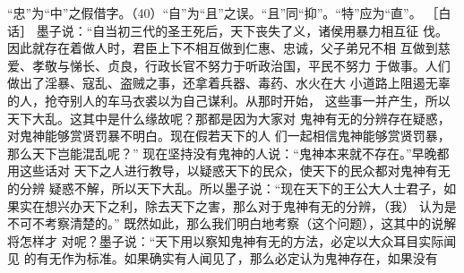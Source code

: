 \documentclass[12pt,UTF8]{ctexbook}
\begin{document}
“忠”为“中”之假借字。（40）“自”为“且”之误。“且”同“抑”。“特”应为“直”。 
［白话］ 
墨子说：“自当初三代的圣王死后，天下丧失了义，诸侯用暴力相互征 
伐。因此就存在着做人时，君臣上下不相互做到仁惠、忠诚，父子弟兄不相 
互做到慈爱、孝敬与悌长、贞良，行政长官不努力于听政治国，平民不努力 
于做事。人们做出了淫暴、寇乱、盗贼之事，还拿着兵器、毒药、水火在大 
小道路上阻遏无辜的人，抢夺别人的车马衣裘以为自己谋利。从那时开始， 
这些事一并产生，所以天下大乱。这其中是什么缘故呢？那都是因为大家对 
鬼神有无的分辨存在疑惑，对鬼神能够赏贤罚暴不明白。现在假若天下的人 
们一起相信鬼神能够赏贤罚暴，那么天下岂能混乱呢？” 
现在坚持没有鬼神的人说：“鬼神本来就不存在。”早晚都用这些话对 
天下之人进行教导，以疑惑天下的民众，使天下的民众都对鬼神有无的分辨 
疑惑不解，所以天下大乱。所以墨子说：“现在天下的王公大人士君子，如 
果实在想兴办天下之利，除去天下之害，那么对于鬼神有无的分辨，（我） 
认为是不可不考察清楚的。” 
既然如此，那么我们明白地考察（这个问题），这其中的说解将怎样才 
对呢？墨子说：“天下用以察知鬼神有无的方法，必定以大众耳目实际闻见 
的有无作为标准。如果确实有人闻见了，那么必定认为鬼神存在，如果没有 
\end{document}
